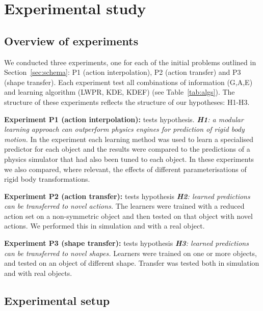 
\newlength{\barchartwidth}
\setlength{\barchartwidth}{6.5cm}

\section{Experimental study}\label{sec:Experiment}

\subsection{Overview of experiments}\label{sec:Experiment.Overview}

We conducted three experiments, one for each of the initial problems outlined in Section~\ref{sec:schema}: P1 (action interpolation), P2 (action transfer) and P3
(shape transfer). Each experiment test all combinations of information (G,A,E) and learning algorithm (LWPR, KDE, KDEF) (see Table~\ref{tab:algs}). The structure of these experiments reflects the structure of our hypotheses: H1-H3.

{\bf Experiment P1 (action interpolation):} tests hypothesis. {\em {\bf H1}: a modular learning approach can outperform physics engines for prediction of rigid body motion.} In the experiment each learning method was used to learn a specialised predictor for each object and the results were compared to the predictions of a physics simulator that had also been tuned to each object. In these experiments we also compared, where relevant, the effects of different parameterisations of rigid body transformations.

{\bf Experiment P2 (action transfer):} tests hypothesis {\em {\bf H2}: learned predictions can be transferred to novel actions.} The learners were trained with a reduced action set on a non-symmetric object and then tested on that object with novel actions. We performed this in simulation and with a real object.

{\bf Experiment P3 (shape transfer):} tests hypothesis {\em {\bf H3}: learned predictions can be transferred to novel shapes.} Learners were trained on one or more objects, and tested on an object of different shape. Transfer was tested both in simulation and with real objects.

\subsection{Experimental setup}\label{sec:Experiment.Setup}

